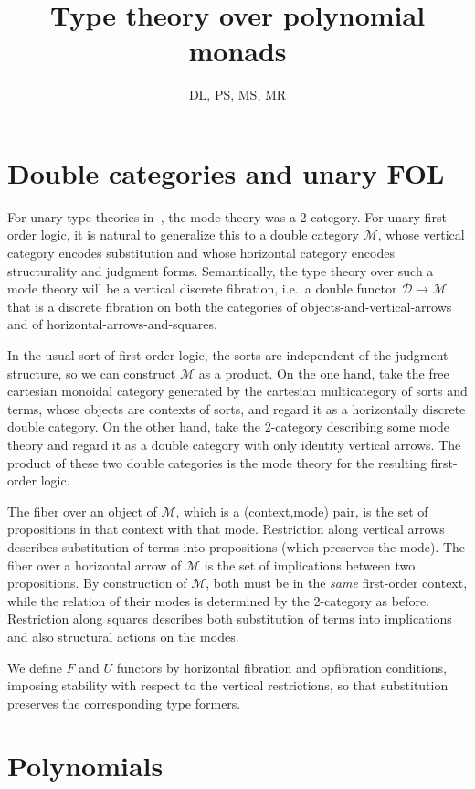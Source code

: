 \documentclass{article}
\title{Type theory over polynomial monads}
\author{DL, PS, MS, MR}
\theoremstyle{definition}
\theoremstyle{remark}
\def\M{\mathcal{M}}
\def\D{\mathcal{D}}
\begin{document}
\maketitle

\section{Double categories and unary FOL}
\label{sec:double-categories}

For unary type theories in~\cite{ls:1var-adjoint-logic}, the mode theory was a 2-category.
For unary first-order logic, it is natural to generalize this to a double category $\M$, whose vertical category encodes substitution and whose horizontal category encodes structurality and judgment forms.
Semantically, the type theory over such a mode theory will be a vertical discrete fibration, i.e.\ a double functor $\D\to\M$ that is a discrete fibration on both the categories of objects-and-vertical-arrows and of horizontal-arrows-and-squares.

In the usual sort of first-order logic, the sorts are independent of the judgment structure, so we can construct $\M$ as a product.
On the one hand, take the free cartesian monoidal category generated by the cartesian multicategory of sorts and terms, whose objects are contexts of sorts, and regard it as a horizontally discrete double category.
On the other hand, take the 2-category describing some mode theory and regard it as a double category with only identity vertical arrows.
The product of these two double categories is the mode theory for the resulting first-order logic.

The fiber over an object of $\M$, which is a (context,mode) pair, is the set of propositions in that context with that mode.
Restriction along vertical arrows describes substitution of terms into propositions (which preserves the mode).
The fiber over a horizontal arrow of $\M$ is the set of implications between two propositions.
By construction of $\M$, both must be in the \emph{same} first-order context, while the relation of their modes is determined by the 2-category as before.
Restriction along squares describes both substitution of terms into implications and also structural actions on the modes.

We define $F$ and $U$ functors by horizontal fibration and opfibration conditions, imposing stability with respect to the vertical restrictions, so that substitution preserves the corresponding type formers.


\section{Polynomials}
\label{sec:polynomials}
\end{document}
